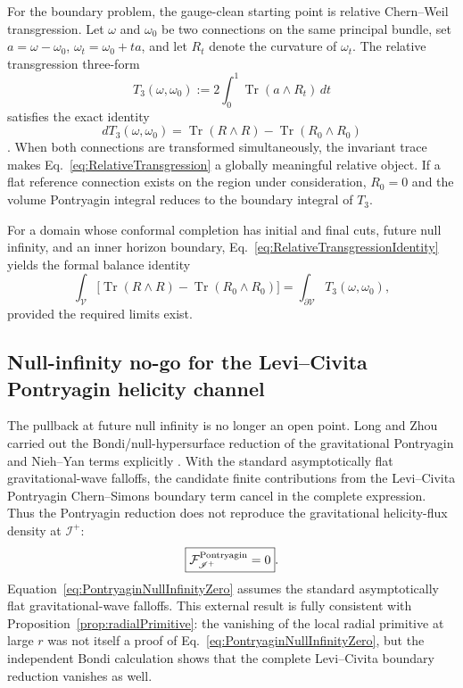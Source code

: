 \documentclass[aps,prd,reprint,nofootinbib,superscriptaddress]{revtex4-2}
\theoremstyle{definition}
\theoremstyle{remark}
\begin{document}
For the boundary problem, the gauge-clean starting point is relative Chern--Weil transgression. Let $\omega$ and $\omega_0$ be two connections on the same principal bundle, set $a=\omega-\omega_0$, $\omega_t=\omega_0+ta$, and let $R_t$ denote the curvature of $\omega_t$. The relative transgression three-form
\begin{equation}
 T_3(\omega,\omega_0)
 :=2\int_0^1\operatorname{Tr}(a\wedge R_t)\,dt
 \label{eq:RelativeTransgression}
\end{equation}
satisfies the exact identity
\begin{equation}
 dT_3(\omega,\omega_0)
 =\operatorname{Tr}(R\wedge R)-\operatorname{Tr}(R_0\wedge R_0)
 \label{eq:RelativeTransgressionIdentity}
\end{equation}
\cite{ChernSimons1974}. When both connections are transformed simultaneously, the invariant trace makes Eq.~\eqref{eq:RelativeTransgression} a globally meaningful relative object. If a flat reference connection exists on the region under consideration, $R_0=0$ and the volume Pontryagin integral reduces to the boundary integral of $T_3$.

For a domain whose conformal completion has initial and final cuts, future null infinity, and an inner horizon boundary, Eq.~\eqref{eq:RelativeTransgressionIdentity} yields the formal balance identity
\begin{equation}
 \int_{\mathcal V}\!\bigl[\operatorname{Tr}(R\wedge R)-\operatorname{Tr}(R_0\wedge R_0)\bigr]
 =\int_{\partial\mathcal V}T_3(\omega,\omega_0),
 \label{eq:BoundaryTransgressionBalance}
\end{equation}
provided the required limits exist.

\subsection{Null-infinity no-go for the Levi--Civita Pontryagin helicity channel}
\label{subsec:PontryaginNullInfinityNoGo}

The pullback at future null infinity is no longer an open point. Long and Zhou carried out the Bondi/null-hypersurface reduction of the gravitational Pontryagin and Nieh--Yan terms explicitly \cite{LongZhou2026}. With the standard asymptotically flat gravitational-wave falloffs, the candidate finite contributions from the Levi--Civita Pontryagin Chern--Simons boundary term cancel in the complete expression. Thus the Pontryagin reduction does not reproduce the gravitational helicity-flux density at $\mathscr I^+$:
\begin{equation}
 \boxed{\mathcal F^{\rm Pontryagin}_{\mathscr I^+}=0}.
 \label{eq:PontryaginNullInfinityZero}
\end{equation}
Equation~\eqref{eq:PontryaginNullInfinityZero} assumes the standard asymptotically flat gravitational-wave falloffs.
This external result is fully consistent with Proposition~\ref{prop:radialPrimitive}: the vanishing of the local radial primitive at large $r$ was not itself a proof of Eq.~\eqref{eq:PontryaginNullInfinityZero}, but the independent Bondi calculation shows that the complete Levi--Civita boundary reduction vanishes as well.
\end{document}
